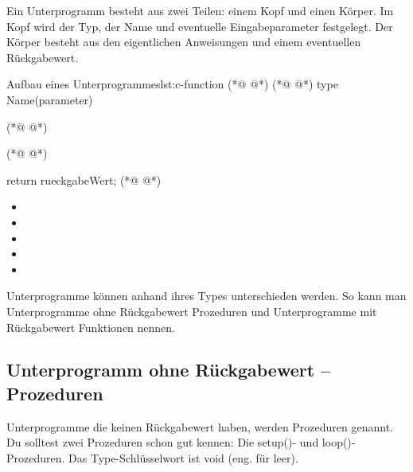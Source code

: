 Ein Unterprogramm besteht aus zwei Teilen: einem Kopf und einen Körper. Im Kopf wird der Typ, der Name und eventuelle Eingabeparameter festgelegt. Der Körper besteht aus den eigentlichen Anweisungen und einem eventuellen Rückgabewert.
\begin{multicols}{2}
\null\vfill
\begin{arduinoCode}{Aufbau eines Unterprogrammes}{lst:c-function}
  (*@  @*)        (*@  @*)
type Name(parameter){
       (*@  @*)
    
  (*@  @*)  


  return rueckgabeWert; (*@  @*)
}           
\end{arduinoCode}
\vfill\null 
\columnbreak
\vfill\null 
\begin{itemize}
  \itemsep15pt
    \item[] 
    \item[] 
    \item[] 
    \item[] 
    \item[] 
 \end{itemize}
\vfill \null

\end{multicols}


Unterprogramme können anhand ihres Types unterschieden werden. So kann man Unterprogramme ohne Rückgabewert Prozeduren und Unterprogramme mit Rückgabewert Funktionen nennen.

\subsection{Unterprogramm ohne Rückgabewert -- Prozeduren}
Unterprogramme die keinen Rückgabewert haben, werden Prozeduren genannt. Du solltest zwei Prozeduren schon gut kennen: Die setup()- und loop()-Prozeduren. Das Type-Schlüsselwort ist void (eng. für leer). 

